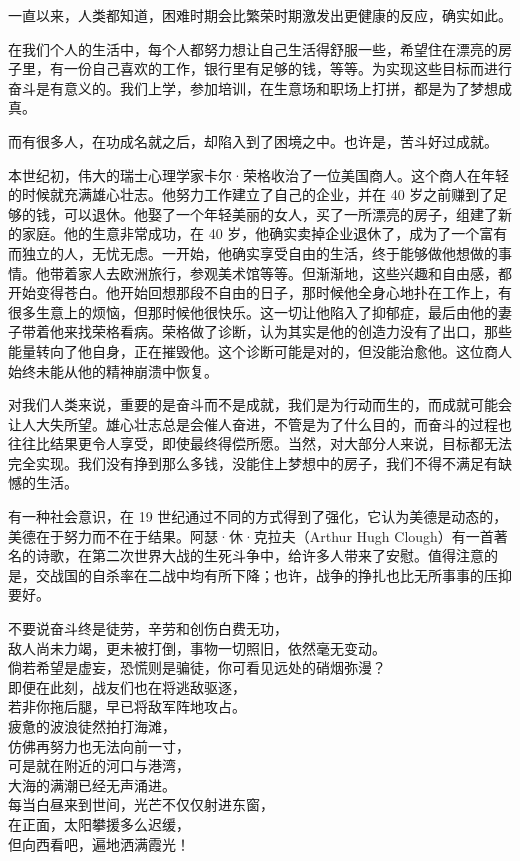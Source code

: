 一直以来，人类都知道，困难时期会比繁荣时期激发出更健康的反应，确实如此。

在我们个人的生活中，每个人都努力想让自己生活得舒服一些，希望住在漂亮的房子里，有一份自己喜欢的工作，银行里有足够的钱，等等。为实现这些目标而进行奋斗是有意义的。我们上学，参加培训，在生意场和职场上打拼，都是为了梦想成真。

而有很多人，在功成名就之后，却陷入到了困境之中。也许是，苦斗好过成就。

本世纪初，伟大的瑞士心理学家卡尔·荣格收治了一位美国商人。这个商人在年轻的时候就充满雄心壮志。他努力工作建立了自己的企业，并在 40 岁之前赚到了足够的钱，可以退休。他娶了一个年轻美丽的女人，买了一所漂亮的房子，组建了新的家庭。他的生意非常成功，在 40 岁，他确实卖掉企业退休了，成为了一个富有而独立的人，无忧无虑。一开始，他确实享受自由的生活，终于能够做他想做的事情。他带着家人去欧洲旅行，参观美术馆等等。但渐渐地，这些兴趣和自由感，都开始变得苍白。他开始回想那段不自由的日子，那时候他全身心地扑在工作上，有很多生意上的烦恼，但那时候他很快乐。这一切让他陷入了抑郁症，最后由他的妻子带着他来找荣格看病。荣格做了诊断，认为其实是他的创造力没有了出口，那些能量转向了他自身，正在摧毁他。这个诊断可能是对的，但没能治愈他。这位商人始终未能从他的精神崩溃中恢复。

对我们人类来说，重要的是奋斗而不是成就，我们是为行动而生的，而成就可能会让人大失所望。雄心壮志总是会催人奋进，不管是为了什么目的，而奋斗的过程也往往比结果更令人享受，即使最终得偿所愿。当然，对大部分人来说，目标都无法完全实现。我们没有挣到那么多钱，没能住上梦想中的房子，我们不得不满足有缺憾的生活。

有一种社会意识，在 19 世纪通过不同的方式得到了强化，它认为美德是动态的，美德在于努力而不在于结果。阿瑟·休·克拉夫（Arthur Hugh Clough）有一首著名的诗歌，在第二次世界大战的生死斗争中，给许多人带来了安慰。值得注意的是，交战国的自杀率在二战中均有所下降；也许，战争的挣扎也比无所事事的压抑要好。

\begin{tcolorbox}
\begin{center}
不要说奋斗终是徒劳，辛劳和创伤白费无功，\\
敌人尚未力竭，更未被打倒，事物一切照旧，依然毫无变动。\\

倘若希望是虚妄，恐慌则是骗徒，你可看见远处的硝烟弥漫？\\
即便在此刻，战友们也在将逃敌驱逐，\\
若非你拖后腿，早已将敌军阵地攻占。\\

疲惫的波浪徒然拍打海滩，\\
仿佛再努力也无法向前一寸，\\
可是就在附近的河口与港湾，\\
大海的满潮已经无声涌进。\\

每当白昼来到世间，光芒不仅仅射进东窗，\\
在正面，太阳攀援多么迟缓，\\
但向西看吧，遍地洒满霞光！
\end{center}
\end{tcolorbox}


